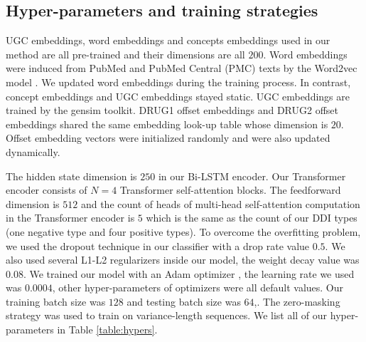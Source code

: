 \documentclass[conference]{IEEEtran}
\begin{document}
\subsection{Hyper-parameters and training strategies}

UGC embeddings, word embeddings and concepts embeddings used in our method are all pre-trained and their dimensions are all $200$.
Word embeddings \cite{moen_distributional_2013} were induced from PubMed and PubMed Central (PMC) texts by the Word2vec model \cite{mikolov_distributed_2013, mikolov_efficient_2013}.
We updated word embeddings during the training process.
In contrast, concept embeddings and UGC embeddings stayed static.
UGC embeddings are trained by the gensim toolkit\cite{rehurek_software_2010}.
DRUG1 offset embeddings and DRUG2 offset embeddings shared the same embedding look-up table whose dimension is $20$.
Offset embedding vectors were initialized randomly and were also updated dynamically.

The hidden state dimension is $250$ in our Bi-LSTM encoder.
Our Transformer encoder consists of $N=4$ Transformer self-attention blocks.
The feedforward dimension is $512$ and the count of heads of multi-head self-attention computation 
in the Transformer encoder is $5$ which is the same as the count of our DDI types
(one negative type and four positive types).
To overcome the overfitting problem, we used the dropout technique in our classifier with a drop rate value $0.5$.
We also used several L1-L2 regularizers \cite{ng_feature_2004}  inside our model, the weight decay value was $0.08$.
We trained our model with an Adam optimizer \cite{kingma_adam:_2014}, the learning rate we used was $0.0004$, other hyper-parameters of optimizers were all default values. Our training batch size was $128$ and testing batch size was $64$,.
The zero-masking strategy was used to train on variance-length sequences.
We list all of our hyper-parameters in Table \ref{table:hypers}.
\end{document}
